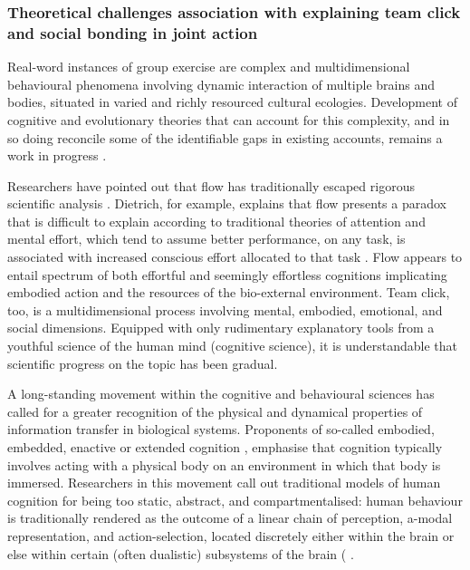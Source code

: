 \begin{CJK}{UTF8}{gbsn}
\subsubsection{Theoretical challenges association with explaining team click and social bonding in joint action}

Real-word instances of group exercise are complex and multidimensional behavioural phenomena involving dynamic interaction of multiple brains and bodies, situated in varied and richly resourced cultural ecologies.  Development of cognitive and evolutionary theories that can account for this complexity, and in so doing reconcile some of the identifiable gaps in existing accounts, remains a work in progress \citep{Fuentes2016}.

Researchers have pointed out that flow has traditionally escaped rigorous scientific analysis \citep{Dietrich2010a,Slingerland2014}. Dietrich, for example, explains that flow presents a paradox that is difficult to explain according to traditional theories of attention and mental effort, which tend to assume better performance, on any task, is associated with increased conscious effort allocated to that task \citep{Dietrich2004b}.  Flow appears to entail spectrum of both effortful and seemingly effortless cognitions implicating embodied action and the resources of the bio-external environment.  Team click, too, is a multidimensional process involving mental, embodied, emotional, and social dimensions.  Equipped with only rudimentary explanatory tools from a youthful science of the human mind (cognitive science), it is understandable that scientific progress on the topic has been gradual.

A long-standing movement within the cognitive and behavioural sciences has called for a greater recognition of the physical and dynamical properties of information transfer in biological systems.  Proponents of so-called embodied, embedded, enactive or extended cognition \citep[now collectively referred to as ``4E cognition,'' see][]{Menary2010}, emphasise that cognition typically involves acting with a physical body on an environment in which that body is immersed. Researchers in this movement call out traditional models of human cognition for being too static, abstract, and compartmentalised: human behaviour is traditionally rendered as the outcome of a linear chain of perception, a-modal representation, and action-selection, located discretely either within the brain or else within certain (often dualistic) subsystems of the brain ( \citep[e.g., emotional and cognitive, System 1 (fast) and System 2 (slow), implicit and explicit, and so on; cf.][]{Diennes1999,Kahneman2011}.


\end{CJK}
